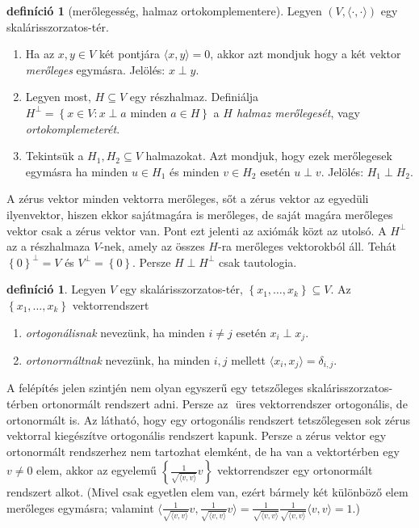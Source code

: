 \documentclass[a4paper, showtrims]{memoir}
\theoremstyle{plain}
\theoremstyle{remark}
\theoremstyle{definition}
\newtheorem{definition}[proposition]{definíció}
\newcommand{\ip}[2]{\langle#1,#2\rangle}
\begin{document}
\begin{definition}[merőlegesség, halmaz ortokomplementere]
	Legyen $\left( V,\ip{\cdot}{\cdot} \right)$ egy skalárisszor\-zatos-tér.
	\begin{enumerate}
		\item
		    Ha az $x,y\in V$ két pontjára $\ip{x}{y}=0$,
		    akkor azt mondjuk hogy a két vektor \emph{merőleges} egymásra.
		    Jelölés: $x\perp y$.
		\item
		    Legyen most, $H\subseteq V$ egy részhalmaz.
		    Definiálja
		    \(
		    H^{\perp}=\left\{ x\in V:x\perp a \text{ minden } a\in H \right\}
		    \)
		    a \emph{$H$ halmaz merőlegesét}, vagy \emph{ortokomplemeterét}.
        \item
            Tekintsük a $H_1,H_2\subseteq V$ halmazokat.
            Azt mondjuk, hogy ezek merőlegesek egymásra ha 
            minden $u\in H_1$ és minden $v\in H_2$ esetén $u\perp v$.
            Jelölés: $H_1\perp H_2$.
            \qedhere
	\end{enumerate}
\end{definition}
A zérus vektor minden vektorra merőleges, sőt a zérus vektor az egyedüli ilyenvektor, 
hiszen ekkor sajátmagára is merőleges, de saját magára merőleges vektor csak a zérus vektor van.
Pont ezt jelenti az axiómák közt az utolsó.
A $H^\perp$ az a részhalmaza $V$-nek, amely az összes $H$-ra merőleges vektorokból áll.
Tehát $\left\{ 0 \right\}^\perp = V$ és $V^{\perp}=\left\{ 0 \right\}$.
Persze $H\perp H^\perp$ csak tautologia.

\begin{definition}
	Legyen $V$ egy skalárisszorzatos-tér, $\left\{ x_1,\ldots,x_k \right\} \subseteq V$.
	Az $\left\{ x_1,\ldots,x_k \right\}$ vektorrendszert
	\begin{enumerate}
		\item \emph{ortogonálisnak} nevezünk, ha minden $i\neq j$ esetén
		      $x_i\perp x_j$.
		\item \emph{ortonormáltnak} nevezünk, ha minden $i,j$ mellett $\ip{x_i}{x_j}=\delta_{i,j}$.\qedhere
	\end{enumerate}
\end{definition}
A felépítés jelen szintjén nem olyan egyszerű egy tetszőleges skalárisszorzatos-térben ortonormált rendszert
adni. Persze az ${}$ üres vektorrendszer ortogonális, de ortonormált is.
Az látható, hogy egy ortogonális rendszert tetszőlegesen sok zérus vektorral kiegészítve ortogonális rendszert kapunk.
Persze a zérus vektor egy ortonormált rendszerhez nem tartozhat elemként,
de ha van a vektortérben egy $v\neq 0$ elem,
akkor az egyelemű $\left\{ \frac{1}{\sqrt{\ip{v}{v}}}v \right\}$ vektorrendszer egy ortonormált rendszert alkot.
(Mivel csak egyetlen elem van, ezért bármely két különböző elem merőleges egymásra;
valamint
$\ip{\frac{1}{\sqrt{\ip{v}{v}}}v}{\frac{1}{\sqrt{\ip{v}{v}}}v}
	=
	\frac{1}{\sqrt{\ip{v}{v}}}
	\frac{1}{\sqrt{\ip{v}{v}}}
	\ip{v}{v}=1.
$)
\end{document}
